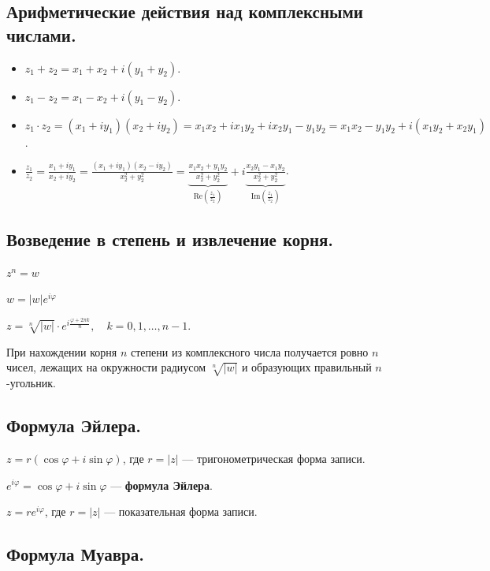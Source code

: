 \newpage


\subsection{
    Арифметические действия над комплексными числами.
}

\begin{itemize}[nosep]
    \item $z_1 + z_2 = x_1 + x_2 + i(y_1 + y_2)$.
    \item $z_1 - z_2 = x_1 - x_2 + i(y_1 - y_2)$.
    \item $z_1 \cdot z_2 = (x_1 + iy_1)(x_2 + iy_2) = x_1x_2 + ix_1y_2 + ix_2y_1 - y_1y_2 = x_1x_2 - y_1y_2 + i(x_1y_2 + x_2y_1)$.
    \item $\frac{z_1}{z_2} = \frac{x_1 + iy_1}{x_2 + iy_2} = \frac{(x_1 + iy_1)(x_2 - iy_2)}{x_2^2 + y_2^2} = \underbrace{\frac{x_1x_2 + y_1y_2}{x_2^2 + y_2^2}}_{\text{Re}(\frac{z_1}{z_2})} + i\underbrace{\frac{x_2y_1 - x_1y_2}{x_2^2 + y_2^2}}_{\text{Im}(\frac{z_1}{z_2})}$.
\end{itemize}

\subsection{
    Возведение в степень и извлечение корня.
}

$z^n = w$

$w = |w|e^{i\varphi}$

$z = \sqrt[n]{|w|} \cdot e^{i \frac{\varphi + 2 \pi k}{n}}, \quad k = 0, 1, \ldots, n - 1.$

При нахождении корня $n$ степени из комплексного числа получается ровно $n$ чисел, лежащих на окружности радиусом $\sqrt[n]{|w|}$ и образующих правильный $n$-угольник.

\subsection{
    Формула Эйлера.
}

$z = r(\cos \varphi + i \sin \varphi)$, где $r = |z|$ — тригонометрическая форма записи.

$e^{i\varphi} = \cos \varphi + i \sin \varphi$ — \textbf{формула Эйлера}.

$z = re^{i\varphi}$, где $r = |z|$ — показательная форма записи.


\subsection{
    Формула Муавра.
}


